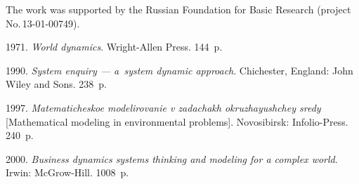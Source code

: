 {


\vspace*{-12pt}

\Ack

\noindent
The work was supported by the Russian Foundation for Basic Research (project
No.\,13-01-00749).


  \begin{multicols}{2}

\renewcommand{\bibname}{\protect\rmfamily References}


{\small\frenchspacing
 {%
 \begin{thebibliography}{99}

 1971. \textit{World dynamics}. Wright-Allen Press. 144~p.

 1990. \textit{System enquiry --- a~system dynamic approach}. Chichester, England: John Wiley and Sons. 238~p.

 1997. \textit{Matema\-ti\-che\-skoe modelirovanie v zadachakh okruzhayushchey sredy}
[Mathematical modeling in environmental problems]. Novosibirsk:
Infolio-Press. 240~p.


 2000. \textit{Business dynamics systems thinking and modeling for a complex world}.
Irwin: McGrow-Hill. 1008~p.



\end{thebibliography}}}
\end{multicols}}
